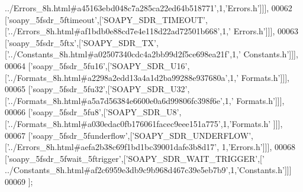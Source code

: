\begin{DoxyCode}
{      ../Errors\_8h.html#a45163ebd048c7a285ca22ed64b518771'},1,\textcolor{stringliteral}{'Errors.h'}]]],
00062   [\textcolor{stringliteral}{'soapy\_5fsdr\_5ftimeout'},[\textcolor{stringliteral}{'SOAPY\_SDR\_TIMEOUT'},[\textcolor{stringliteral}{'../Errors\_8h.html#af1bdb0e88cd7e4e118d22ad72501b668'},1,\textcolor{stringliteral}{'
      Errors.h'}]]],
00063   [\textcolor{stringliteral}{'soapy\_5fsdr\_5ftx'},[\textcolor{stringliteral}{'SOAPY\_SDR\_TX'},[\textcolor{stringliteral}{'../Constants\_8h.html#a02507340cdc4a2bb99d2f5ce698ea21f'},1,\textcolor{stringliteral}{'
      Constants.h'}]]],
00064   [\textcolor{stringliteral}{'soapy\_5fsdr\_5fu16'},[\textcolor{stringliteral}{'SOAPY\_SDR\_U16'},[\textcolor{stringliteral}{'../Formats\_8h.html#a2298a2edd13a4a1d2ba99288e937680a'},1,\textcolor{stringliteral}{'
      Formats.h'}]]],
00065   [\textcolor{stringliteral}{'soapy\_5fsdr\_5fu32'},[\textcolor{stringliteral}{'SOAPY\_SDR\_U32'},[\textcolor{stringliteral}{'../Formats\_8h.html#a5a7d56384e6600e0a6d99806fc398f6e'},1,\textcolor{stringliteral}{'
      Formats.h'}]]],
00066   [\textcolor{stringliteral}{'soapy\_5fsdr\_5fu8'},[\textcolor{stringliteral}{'SOAPY\_SDR\_U8'},[\textcolor{stringliteral}{'../Formats\_8h.html#a030edac0fb176061facec9eee151a775'},1,\textcolor{stringliteral}{'Formats.h'}
      ]]],
00067   [\textcolor{stringliteral}{'soapy\_5fsdr\_5funderflow'},[\textcolor{stringliteral}{'SOAPY\_SDR\_UNDERFLOW'},[\textcolor{stringliteral}{'../Errors\_8h.html#aefa2b38c69f1bd1bc39001dafe3b8d17'},
      1,\textcolor{stringliteral}{'Errors.h'}]]],
00068   [\textcolor{stringliteral}{'soapy\_5fsdr\_5fwait\_5ftrigger'},[\textcolor{stringliteral}{'SOAPY\_SDR\_WAIT\_TRIGGER'},[\textcolor{stringliteral}{'
      ../Constants\_8h.html#af2c6959e3db9c9b968d467c39e5eb7b9'},1,\textcolor{stringliteral}{'Constants.h'}]]]
00069 ];
\end{DoxyCode}
